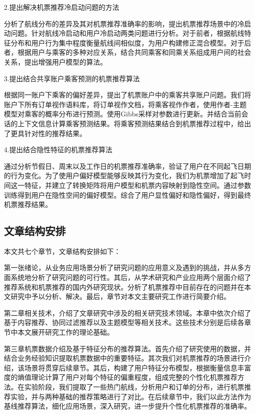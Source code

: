 2.提出解决机票推荐冷启动问题的方法

分析了航线分布的差异及其对机票推荐准确率的影响，提出机票推荐场景中的冷启动问题。针对航线冷启动和用户冷启动两类问题进行分析。对于前者，根据航线特征分布和用户行为集中程度衡量航线间相似度，为用户构建修正混合模型。对于后者，根据用户与乘客的多种对应关系，结合共同乘客和同乘关系组成用户间的社会关系，提出增强用户模型的算法。


3.提出结合共享账户乘客预测的机票推荐算法

根据同一账户下乘客的偏好差异，提出了机票账户中的乘客共享账户问题。我们将账户下所有订单视作语料库，将订单视作文档，将乘客视作作者，使用作者-主题模型对乘客的概率分布进行预测。使用Gibbs采样对参数进行更新。并结合当前会话的上下文信息计算乘客预测结果。将乘客预测结果结合到机票推荐过程中，给出了更具针对性的推荐结果。

4.提出结合隐性特征的机票推荐算法

通过分析节假日、周末以及工作日的机票推荐准确率，验证了用户在不同起飞日期的行为变化。为了使用户偏好模型能够反映其行为变化，我们为机票增加了起飞时间这一特征，并建立了转换矩阵将用户模型和机票内容映射到隐性空间。通过参数训练得到用户在隐性空间的偏好模型。综合了用户显性偏好和隐性偏好，得到最终机票推荐结果。


\subsection{文章结构安排}
本文共七个章节，文章结构安排如下：

第一张绪论，从业务应用场景分析了研究问题的应用意义及遇到的挑战，并从多方面系统地分析了研究问题的可行性。其后，从学术研究和产业应用两个层面介绍了推荐系统和机票推荐的国内外研究现状。分析了机票推荐中目前存在的问题并在本文研究中予以分析、解决。最后，章节对本文主要研究工作进行简要介绍。

第二章相关技术，介绍了文章研究中涉及的相关研究技术领域。本章中依次介绍了基于内容推荐、协同过滤推荐以及主题模型等相关技术。这些技术分别是后续各章节中本文展开研究工作的理论基础。

第三章机票数据介绍及基于特征分布的推荐算法。首先介绍了研究使用的数据，并结合业务经验知识提取机票数据中的重要特征。其次我们对机票推荐的场景进行介绍，该场景将贯穿后续章节。其后，构建了用户特征分布模型，根据衡量信息丰富度的熵值理论计算了用户对每个特征的偏重程度，组成完整的个性化机票推荐方法。在实验阶段，我们提取了一些热门航线，分析用户和订单的分布，进行机票推荐实验，并与两种基础的推荐策略进行了对比。在后续章节中，我们以此方法作为基线推荐算法，细化应用场景，深入研究，进一步提升个性化机票推荐的准确率。

